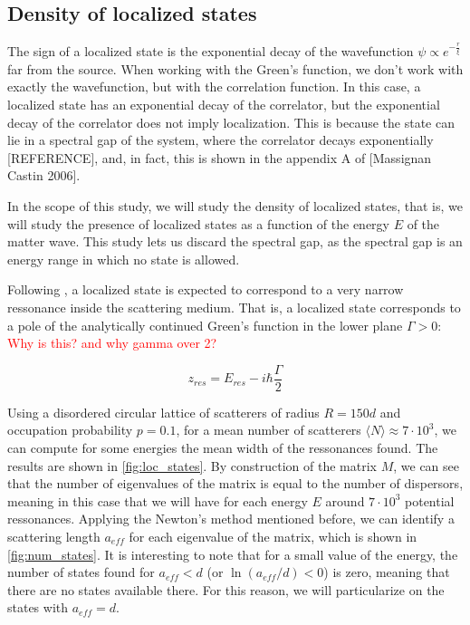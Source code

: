 \subsection{Density of localized states}

The sign of a localized state is the exponential decay of the wavefunction $\psi\propto e^{-\frac{r}{\xi}}$ far from the source. When working with the Green's function, we don't work with exactly the wavefunction, but with the correlation function. In this case, a localized state has an exponential decay of the correlator, but the exponential decay of the correlator does not imply localization. This is because the state can lie in a spectral gap of the system, where the correlator decays exponentially [REFERENCE], and, in fact, this is shown in the appendix A of [Massignan Castin 2006]. 

In the scope of this study, we will study the density of localized states, that is, we will study the presence of localized states as a function of the energy $E$ of the matter wave. This study lets us discard the spectral gap, as the spectral gap is an energy range in which no state is allowed.

Following \cite{antezzaQuantitativeStudyTwo2010}, a localized state is expected to correspond to a very narrow ressonance inside the scattering medium. That is, a localized state corresponds to a pole of the analytically continued Green's function in the lower plane $\Gamma >0$: \textcolor{red}{Why is this? and why gamma over 2?}

\begin{equation}
    z_{res}=E_{res}-i\hbar \frac{\Gamma}{2}
    \label{eq:resonance}
\end{equation}

Using a disordered circular lattice of scatterers of radius $R=150d$ and occupation probability $p=0.1$, for a mean number of scatterers $\langle N\rangle \approx 7\cdot 10^3$, we can compute for some energies the mean width of the ressonances found. The results are shown in \cref{fig:loc_states}. By construction of the matrix $M$, we can see that the number of eigenvalues of the matrix is equal to the number of dispersors, meaning in this case that we will have for each energy $E$ around $7\cdot 10^3$ potential ressonances. Applying the Newton's method mentioned before, we can identify a scattering length $a_{eff}$ for each eigenvalue of the matrix, which is shown in \cref{fig:num_states}. It is interesting to note that for a small value of the energy, the number of states found for $a_{eff}<d$ (or $\ln(a_{eff}/d)<0$) is zero, meaning that there are no states available there. For this reason, we will particularize on the states with $a_{eff}=d$.

